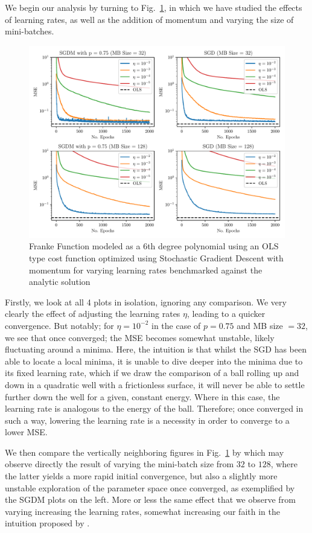 \documentclass[reprint, english, nofootinbib]{revtex4-2}
\begin{document}
We begin our analysis by turning to Fig.~\ref{fig: SGD learning rate}, in which we have studied the effects of learning rates, as well as the addition of momentum and varying the size of mini-batches.
\begin{figure}[h!tb]
    \center
    \includegraphics[width=\columnwidth]{SGD_learning_rate.pdf}
    \caption{\label{fig: SGD learning rate}Franke Function modeled as a 6th degree polynomial using an OLS type cost function optimized using Stochastic Gradient Descent with momentum for varying learning rates benchmarked against the analytic solution}
\end{figure}
Firstly, we look at all 4 plots in isolation, ignoring any comparison. We very clearly the effect of adjusting the learning rates $\eta$, leading to a quicker convergence. But notably; for $\eta = 10^{-2}$ in the case of $p=0.75$ and MB size $=32$, we see that once converged; the MSE becomes somewhat unstable, likely fluctuating around a minima. Here, the intuition is that whilst the SGD has been able to locate a local minima, it is unable to dive deeper into the minima due to its fixed learning rate, which if we draw the comparison of a ball rolling up and down in a quadratic well with a frictionless surface, it will never be able to settle further down the well for a given, constant energy. Where in this case, the learning rate is analogous to the energy of the ball. Therefore; once converged in such a way, lowering the learning rate is a necessity in order to converge to a lower MSE.

We then compare the vertically neighboring figures in Fig.~\ref{fig: SGD learning rate} by which may observe directly the result of varying the mini-batch size from $32$ to $128$, where the latter yields a more rapid initial convergence, but also a slightly more unstable exploration of the parameter space once converged, as exemplified by the SGDM plots on the left. More or less the same effect that we observe from varying increasing the learning rates, somewhat increasing our faith in the intuition proposed by \textcite{ManyBodyML}.
\end{document}
